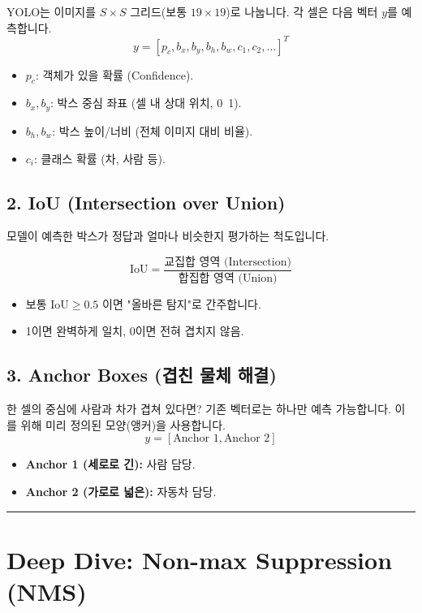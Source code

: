 \documentclass[11pt,a4paper]{book}
\theoremstyle{definition}
\begin{document}
YOLO는 이미지를 $S \times S$ 그리드(보통 $19 \times 19$)로 나눕니다.
각 셀은 다음 벡터 $y$를 예측합니다.
$$ y = [p_c, b_x, b_y, b_h, b_w, c_1, c_2, \dots]^T $$
\begin{itemize}
    \item $p_c$: 객체가 있을 확률 (Confidence).
    \item $b_x, b_y$: 박스 중심 좌표 (셀 내 상대 위치, 0~1).
    \item $b_h, b_w$: 박스 높이/너비 (전체 이미지 대비 비율).
    \item $c_i$: 클래스 확률 (차, 사람 등).
\end{itemize}

\subsection{2. IoU (Intersection over Union)}


모델이 예측한 박스가 정답과 얼마나 비슷한지 평가하는 척도입니다.
\begin{formulabox}[title={IoU 수식}]
$$ \text{IoU} = \frac{\text{교집합 영역 (Intersection)}}{\text{합집합 영역 (Union)}} $$
\begin{itemize}
    \item 보통 $\text{IoU} \ge 0.5$ 이면 "올바른 탐지"로 간주합니다.
    \item 1이면 완벽하게 일치, 0이면 전혀 겹치지 않음.
\end{itemize}
\end{formulabox}

\subsection{3. Anchor Boxes (겹친 물체 해결)}
한 셀의 중심에 사람과 차가 겹쳐 있다면?
기존 벡터로는 하나만 예측 가능합니다. 이를 위해 미리 정의된 모양(앵커)을 사용합니다.
$$ y = [\text{Anchor 1}, \text{Anchor 2}] $$
\begin{itemize}
    \item \textbf{Anchor 1 (세로로 긴):} 사람 담당.
    \item \textbf{Anchor 2 (가로로 넓은):} 자동차 담당.
\end{itemize}

\vspace{0.5cm}\hrule\vspace{0.5cm}

\section{Deep Dive: Non-max Suppression (NMS)}
\end{document}
